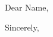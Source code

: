 \documentclass[department=MANE]{RPIletterhead}
\date{06.30.2025}
\begin{document}
\begin{letter}

\opening{Dear Name,}

\lipsum[1-10]

\closing{Sincerely,}

\end{letter}
\end{document}
